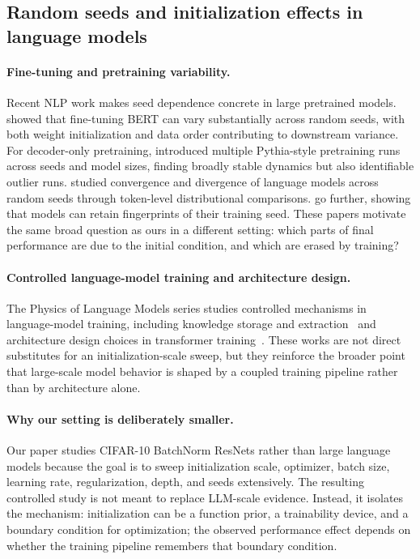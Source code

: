 \documentclass{article}
\begin{document}
\subsection{Random seeds and initialization effects in language models}
\label{app:llm-seeds}

\paragraph{Fine-tuning and pretraining variability.}
Recent NLP work makes seed dependence concrete in large pretrained models.  \citep{dodge2020finetuning} showed that fine-tuning BERT can vary substantially across random seeds, with both weight initialization and data order contributing to downstream variance.  For decoder-only pretraining, \citep{vanderwal2025polypythias} introduced multiple Pythia-style pretraining runs across seeds and model sizes, finding broadly stable dynamics but also identifiable outlier runs.  \citep{fehlauer2025convergence} studied convergence and divergence of language models across random seeds through token-level distributional comparisons.  \citep{tong2026seedprints} go further, showing that models can retain fingerprints of their training seed.  These papers motivate the same broad question as ours in a different setting: which parts of final performance are due to the initial condition, and which are erased by training?

\paragraph{Controlled language-model training and architecture design.}
The Physics of Language Models series studies controlled mechanisms in language-model training, including knowledge storage and extraction~\citep{allenzhu2024physics31} and architecture design choices in transformer training~\citep{allenzhu2025physics41}.  These works are not direct substitutes for an initialization-scale sweep, but they reinforce the broader point that large-scale model behavior is shaped by a coupled training pipeline rather than by architecture alone.

\paragraph{Why our setting is deliberately smaller.}
Our paper studies CIFAR-10 BatchNorm ResNets rather than large language models because the goal is to sweep initialization scale, optimizer, batch size, learning rate, regularization, depth, and seeds extensively.  The resulting controlled study is not meant to replace LLM-scale evidence.  Instead, it isolates the mechanism: initialization can be a function prior, a trainability device, and a boundary condition for optimization; the observed performance effect depends on whether the training pipeline remembers that boundary condition.
\end{document}
